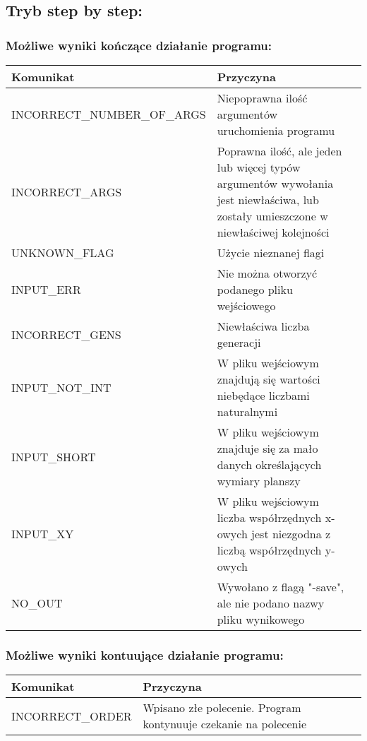 \documentclass[11pt,a4paper]{report}
\begin{document}
\subsection[Tryb step by step] {Tryb step by step:}

\subsubsection {Możliwe wyniki kończące działanie programu:}
\begin{tabularx}{\textwidth}{  X|Xl  }
 \hline
 Komunikat                                   					& Przyczyna\\
 \hline \hline
			INCORRECT\_NUMBER\_OF\_ARGS	&Niepoprawna ilość argumentów uruchomienia programu\\
 \hline
			INCORRECT\_ARGS			&Poprawna ilość, ale jeden lub więcej typów argumentów wywołania jest niewłaściwa, lub zostały umieszczone w niewłaściwej kolejności\\
 \hline
			UNKNOWN\_FLAG	 			&Użycie nieznanej flagi\\
 \hline
			INPUT\_ERR					&Nie można otworzyć podanego pliku wejściowego\\
 \hline
			INCORRECT\_GENS				&Niewłaściwa liczba generacji\\
 \hline
			INPUT\_NOT\_INT			&W pliku wejściowym znajdują się wartości niebędące liczbami naturalnymi\\
 \hline
			INPUT\_SHORT				&W pliku wejściowym znajduje się za mało danych określających wymiary planszy\\
 \hline
			INPUT\_XY					&W pliku wejściowym liczba współrzędnych x-owych jest niezgodna z liczbą współrzędnych y-owych\\
 \hline
			NO\_OUT					&Wywołano z flagą "-save", ale nie podano nazwy pliku wynikowego\\
 \hline
\end{tabularx}

\subsubsection{Możliwe wyniki kontuujące działanie programu:}
\begin{tabularx}{\textwidth}{  X|Xl  }
\hline
Komunikat                                    					& Przyczyna\\
\hline \hline
			INCORRECT\_ORDER			&Wpisano złe polecenie. Program kontynuuje czekanie na polecenie\\
\hline

\end{tabularx}
\end{document}
